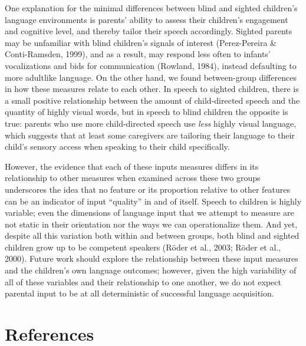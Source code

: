 \documentclass[
  man,floatsintext]{apa6}
\begin{document}
One explanation for the minimal differences between blind and sighted children's language environments is parents' ability to assess their children's engagement and cognitive level, and thereby tailor their speech accordingly. Sighted parents may be unfamiliar with blind children's signals of interest (Perez-Pereira \& Conti-Ramsden, 1999), and as a result, may respond less often to infants' vocalizations and bids for communication (Rowland, 1984), instead defaulting to more adultlike language. On the other hand, we found between-group differences in how these measures relate to each other. In speech to sighted children, there is a small positive relationship between the amount of child-directed speech and the quantity of highly visual words, but in speech to blind children the opposite is true: parents who use more child-directed speech use \emph{less} highly visual language, which suggests that at least some caregivers are tailoring their language to their child's sensory access when speaking to their child specifically.

However, the evidence that each of these inputs measures differs in its relationship to other measures when examined across these two groups underscores the idea that no feature or its proportion relative to other features can be an indicator of input ``quality'' in and of itself. Speech to children is highly variable; even the dimensions of language input that we attempt to measure are not static in their orientation nor the ways we can operationalize them. And yet, despite all this variation both within and between groups, both blind and sighted children grow up to be competent speakers (Röder et al., 2003; Röder et al., 2000). Future work should explore the relationship between these input measures and the children's own language outcomes; however, given the high variability of all of these variables and their relationship to one another, we do not expect parental input to be at all deterministic of successful language acquisition.

\pagebreak

\hypertarget{references}{%
\section*{References}\label{references}}
\end{document}
